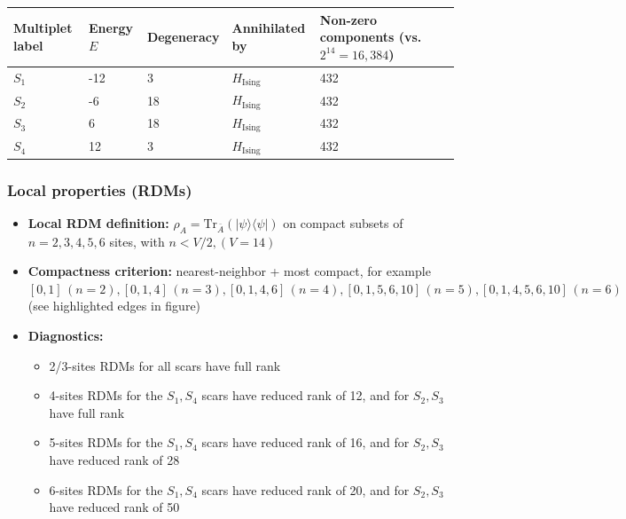 \documentclass[11pt,a4paper]{article}
\newcommand{\Hising}{H_{\mathrm{Ising}}}
\begin{document}
\begin{center}
\begin{tabular}{L{3.5cm} C{2.2cm} C{2.2cm} C{2.2cm} C{3.0cm} C{3.2cm}}
\toprule
\textbf{Multiplet label} & \textbf{Energy $E$} & \textbf{Degeneracy} & \textbf{Annihilated by} & \textbf{Non-zero components (vs.\ $2^{14} = 16,384$)} \\
\midrule
$S_1$ & -12 & 3 & $\Hising$ & 432\\
\midrule
$S_2$ & -6 & 18 & $\Hising$ & 432\\
\midrule
$S_3$ & 6 & 18 & $\Hising$ & 432\\
\midrule
$S_4$ & 12 & 3 & $\Hising$ & 432\\
\bottomrule
\end{tabular}
\end{center}

\subsubsection*{Local properties (RDMs)}

\begin{itemize}[leftmargin=1.5em]
  \item \textbf{Local RDM definition:} $\rho_A=\mathrm{Tr}_{\bar A}(|\psi\rangle\langle\psi|)$ on compact subsets of $n=2,3,4,5,6$ sites, with $n < V/2, (V=14)$
  \item \textbf{Compactness criterion:} nearest-neighbor + most compact, for example $[0,1] \, (n = 2), [0,1,4] \, (n = 3), [0,1,4,6] \,  (n = 4), [0,1,5,6,10] \, (n = 5), [0,1,4,5,6,10] \, (n = 6)$ (see highlighted edges in figure)
  \item \textbf{Diagnostics:} \begin{itemize} \item 2/3-sites RDMs for all scars have full rank \item 4-sites RDMs for the $S_1,S_4$ scars have reduced rank of 12, and for $S_2,S_3$ have full rank \item 5-sites RDMs for the $S_1,S_4$ scars have reduced rank of 16, and for $S_2,S_3$ have reduced rank of 28 \item 6-sites RDMs for the $S_1,S_4$ scars have reduced rank of 20, and for $S_2,S_3$ have reduced rank of 50 \end{itemize}
\end{itemize}


\end{document}
